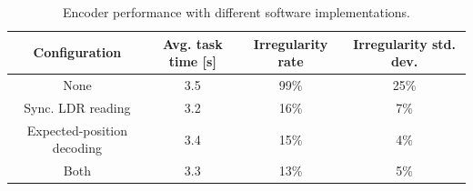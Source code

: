 




\begin{table}[H]
\centering
\small
\begin{tabular}{|c|c|c|c|}
\hline
Configuration & Avg. task time [s] & Irregularity rate & Irregularity std. dev. \\
\hline
None & 3.5 & 99\% & 25\% \\
Sync. LDR reading & 3.2 & 16\% & 7\% \\
Expected-position decoding & 3.4 & 15\% & 4\% \\
Both & 3.3 & 13\% & 5\% \\
\hline
\end{tabular}
\caption{Encoder performance with different software implementations.}
\label{tab:encoder-software-performance}
\end{table}



